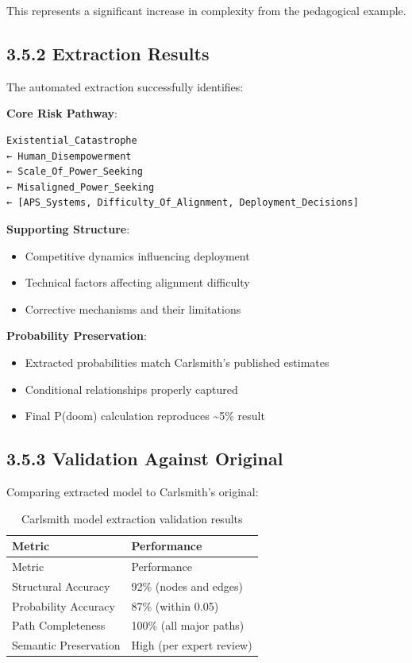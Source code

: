 \documentclass[
  11pt,
  letterpaper,
]{book}
\providecommand{\tightlist}{%
  \setlength{\itemsep}{0pt}\setlength{\parskip}{0pt}}
\begin{document}
This represents a significant increase in complexity from the
pedagogical example.

\subsection*{3.5.2 Extraction Results}\label{sec-carlsmith-extraction}

The automated extraction successfully identifies:

\textbf{Core Risk Pathway}:

\begin{verbatim}
Existential_Catastrophe 
← Human_Disempowerment 
← Scale_Of_Power_Seeking
← Misaligned_Power_Seeking
← [APS_Systems, Difficulty_Of_Alignment, Deployment_Decisions]
\end{verbatim}

\textbf{Supporting Structure}:

\begin{itemize}
\tightlist
\item
  Competitive dynamics influencing deployment
\item
  Technical factors affecting alignment difficulty
\item
  Corrective mechanisms and their limitations
\end{itemize}

\textbf{Probability Preservation}:

\begin{itemize}
\tightlist
\item
  Extracted probabilities match Carlsmith's published estimates
\item
  Conditional relationships properly captured
\item
  Final P(doom) calculation reproduces \textasciitilde5\% result
\end{itemize}

\subsection*{3.5.3 Validation Against
Original}\label{sec-carlsmith-validation}

Comparing extracted model to Carlsmith's original:

\begin{longtable}[]{@{}ll@{}}
\caption{Carlsmith model extraction validation
results}\label{tbl-carlsmith-validation}\tabularnewline
\toprule\noalign{}
Metric & Performance \\
\midrule\noalign{}
\endfirsthead
\toprule\noalign{}
Metric & Performance \\
\midrule\noalign{}
\endhead
\bottomrule\noalign{}
\endlastfoot
Structural Accuracy & 92\% (nodes and edges) \\
Probability Accuracy & 87\% (within 0.05) \\
Path Completeness & 100\% (all major paths) \\
Semantic Preservation & High (per expert review) \\
\end{longtable}
\end{document}
